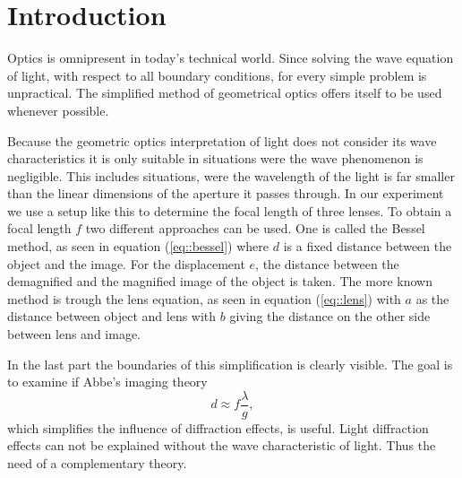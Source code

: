 \section{Introduction}
Optics is omnipresent in today's technical world.
Since solving the wave equation of light, with respect to all boundary conditions, for every simple problem is unpractical.
The simplified method of geometrical optics offers itself to be used whenever possible.

Because the geometric optics interpretation of light does not consider its wave characteristics it is only suitable in situations were the wave phenomenon is negligible.
This includes situations, were the wavelength of the light is far smaller than the linear dimensions of the aperture it passes through. 
In our experiment we use a setup like this to determine the focal length of three lenses. 
To obtain a focal length $f$ two different approaches can be used.
One is called the Bessel method\cite{manual}, as seen in equation (\ref{eq::bessel})
where $d$ is a fixed distance between the object and the image.
For the displacement $e$, the distance between the demagnified and the magnified image of the object is taken.
The more known method is trough the lens equation\cite{manual}, as seen in equation (\ref{eq::lens})
with $a$ as the distance between object and lens with $b$ giving the distance on the other side between lens and image.

In the last part the boundaries of this simplification is clearly visible. 
The goal is to examine if Abbe's imaging theory\cite{manual}
\begin{equation}
d \approx f\frac{\lambda}{g},
\label{eq::diff}
\end{equation}
which simplifies the influence of diffraction effects, is useful. 
Light diffraction effects can not be explained without the wave characteristic of light.
Thus the need of a complementary theory.
